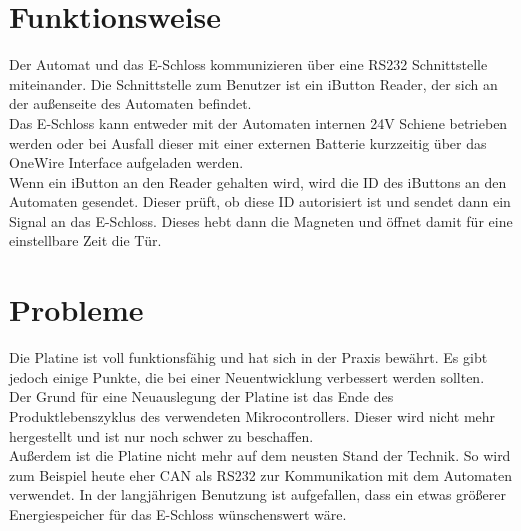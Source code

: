 \section{Funktionsweise}
Der Automat und das E-Schloss kommunizieren über eine RS232 Schnittstelle miteinander. Die Schnittstelle zum Benutzer ist
ein iButton Reader, der sich an der außenseite des Automaten befindet. \\
Das E-Schloss kann entweder mit der Automaten internen 24V Schiene betrieben werden oder bei Ausfall dieser mit einer externen
Batterie kurzzeitig über das OneWire Interface aufgeladen werden. \\
Wenn ein iButton an den Reader gehalten wird, wird die ID des iButtons an den Automaten gesendet. Dieser prüft, ob diese ID
autorisiert ist und sendet dann ein Signal an das E-Schloss. Dieses hebt dann die Magneten und öffnet damit für eine
einstellbare Zeit die Tür.

\section{Probleme}
Die Platine ist voll funktionsfähig und hat sich in der Praxis bewährt. Es gibt jedoch einige Punkte, die bei einer
Neuentwicklung verbessert werden sollten. \\
Der Grund für eine Neuauslegung der Platine ist das Ende des Produktlebenszyklus des verwendeten Mikrocontrollers.
Dieser wird nicht mehr hergestellt und ist nur noch schwer zu beschaffen. \\
Außerdem ist die Platine nicht mehr auf dem neusten Stand der Technik. So wird zum Beispiel heute eher \ac{CAN} als RS232
zur Kommunikation mit dem Automaten verwendet. In der langjährigen Benutzung ist aufgefallen, dass ein etwas größerer
Energiespeicher für das E-Schloss wünschenswert wäre.
